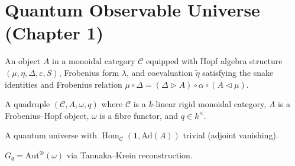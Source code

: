 %
%

\chapter{Quantum Observable Universe (Chapter 1)}

\begin{definition}
  \label{def:frobenius-hopf-data}
  An object $A$ in a monoidal category $\mathcal{C}$ equipped with
  Hopf algebra structure $(\mu,\eta,\Delta,\varepsilon,S)$,
  Frobenius form $\lambda$, and coevaluation $\tilde\eta$
  satisfying the snake identities and Frobenius relation
  $\mu \circ \Delta = (\Delta \triangleright A) \circ \alpha \circ (A \triangleleft \mu)$.
\end{definition}

\begin{definition}
  \label{def:quantum-universe}
  A quadruple $(\mathcal{C}, A, \omega, q)$ where $\mathcal{C}$ is a
  $k$-linear rigid monoidal category, $A$ is a Frobenius–Hopf object,
  $\omega$ is a fibre functor, and $q \in k^\times$.
\end{definition}

\begin{definition}
  \label{def:quantum-observable-universe}
  A quantum universe with $\operatorname{Hom}_{\mathcal{C}}(\mathbf{1}, \mathrm{Ad}(A))$
  trivial (adjoint vanishing).
\end{definition}

\begin{definition}
  \label{def:gauge-group-categorical}
  $G_q = \mathrm{Aut}^{\otimes}(\omega)$ via Tannaka–Krein reconstruction.
\end{definition}

